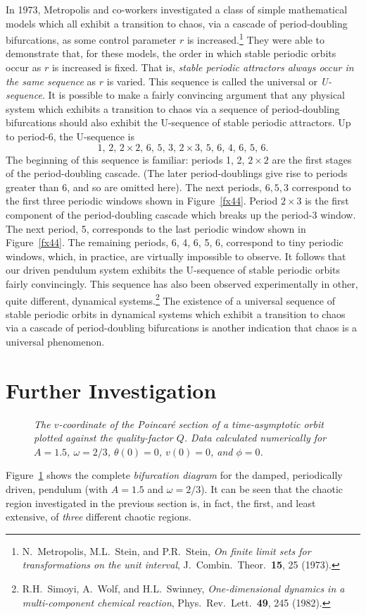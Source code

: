 In 1973, Metropolis and co-workers investigated a class of simple mathematical models which all
exhibit a transition to chaos, via a cascade of period-doubling bifurcations, as
some control parameter $r$ is increased.\footnote{N.~Metropolis,
M.L.~Stein, and P.R.~Stein, {\em On finite limit sets for transformations
on the unit interval}, J.\ Combin.\ Theor.\ {\bf 15}, 25 (1973).} They were able to demonstrate
that, for these models,  the order in which stable periodic orbits occur as $r$ is
increased  is fixed. 
That is, {\em stable periodic attractors always occur in the same sequence}\/ as
$r$ is varied. This sequence is
called the universal or {\em U-sequence}. It is possible to make a fairly
convincing argument that any physical system which exhibits a transition to chaos
via a sequence of period-doubling bifurcations should also exhibit the U-sequence
of stable periodic attractors.
Up to period-6, the U-sequence is
$$
1, \,2,\, 2\times 2,\, 6,\, 5,\, 3,\, 2\times 3,\, 5, \,6,\, 4,\, 6,\, 5,\, 6.
$$
The beginning of this sequence is familiar: periods 1, 2, $2\times 2$ are the
first stages of the  period-doubling cascade. (The later period-doublings
give rise to periods greater than 6, and so are omitted here). The next periods,
$6,5,3$ correspond to the first three periodic windows shown in Figure~\ref{fx44}. 
Period $2\times 3$ is the first component of the period-doubling cascade which
breaks up the period-3 window. The next period, 5, corresponds to the last
periodic window shown in Figure~\ref{fx44}. The remaining periods,
6, 4, 6, 5, 6, correspond to tiny periodic windows, which, in practice,
are virtually impossible to  observe. It follows that our
driven pendulum system exhibits the U-sequence of stable periodic orbits fairly
convincingly. This sequence has also been observed experimentally in other,
quite different, dynamical systems.\footnote{R.H.~Simoyi,
A.~Wolf, and H.L.~Swinney, {\em One-dimensional dynamics in a multi-component
chemical reaction}, Phys.\ Rev.\ Lett.\ {\bf 49}, 245 (1982).} The existence of
a universal sequence of stable periodic orbits in dynamical systems which
exhibit a transition to chaos via a cascade of period-doubling bifurcations
 is another indication that
chaos is a universal phenomenon.

\section{Further Investigation}
\begin{figure}
\centerline{}
\caption{\em The $v$-coordinate of the Poincar\'{e} section of a time-asymptotic orbit
plotted against the quality-factor $Q$. Data
 calculated numerically for
$A=1.5$, $\omega=2/3$, $\theta(0)=0$, $v(0)=0$, and $\phi=0$.}\label{f49}
\end{figure}
Figure~\ref{f49} shows the complete {\em bifurcation diagram}\/ for the damped, periodically
driven, pendulum (with $A=1.5$ and $\omega=2/3$). 
 It can be seen that the chaotic region investigated in the previous section is, in fact,
the first, and least extensive, of {\em three}\/ different chaotic regions. 

